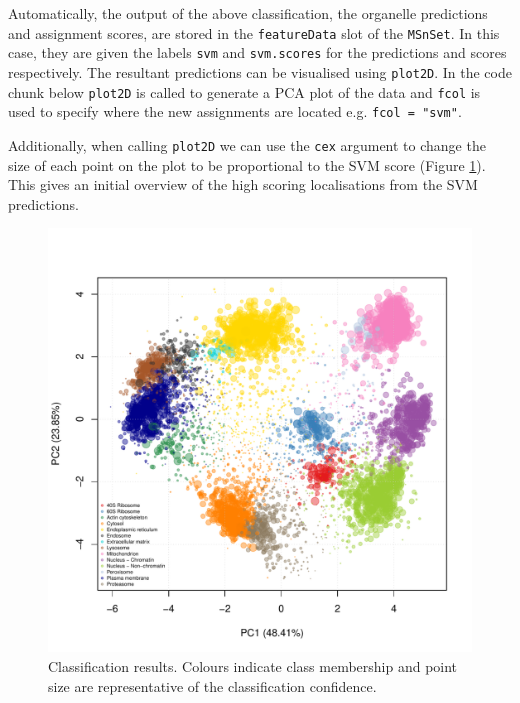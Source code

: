 Automatically, the output of the above classification, the organelle
predictions and assignment scores, are stored in the
\texttt{featureData} slot of the \texttt{MSnSet}. In this case, they
are given the labels \texttt{svm} and \texttt{svm.scores} for the
predictions and scores respectively. The resultant predictions can be
visualised using \texttt{plot2D}. In the code chunk below
\texttt{plot2D} is called to generate a PCA plot of the data and
\texttt{fcol} is used to specify where the new assignments are located
e.g. \texttt{fcol = "svm"}.

Additionally, when calling \texttt{plot2D} we can use the \texttt{cex}
argument to change the size of each point on the plot to be
proportional to the SVM score (Figure \ref{fig:plotSVM}). This gives
an initial overview of the high scoring localisations from the SVM
predictions.



\begin{figure}[!ht]
  \centering
\begin{knitrout}
\color{fgcolor}\begin{kframe}
\begin{alltt}
 \hlkwb{<-} \hlstd{(}\hlopt{$} \hlopt{-} 
  \hlstd{=} \hlstd{,}  
  \hlstd{=} \hlstd{,}  \hlstd{=} \hlstd{,}  \hlstd{=} \hlstd{,}  \hlstd{=} \hlstd{)}
\end{alltt}
\end{kframe}
\includegraphics[width=.8\textwidth]{figure/plotSVM-1} 

\end{knitrout}
\caption{Classification results. Colours indicate class membership and
  point size are representative of the classification confidence.}
  \label{fig:plotSVM}
\end{figure}
\pagebreak

